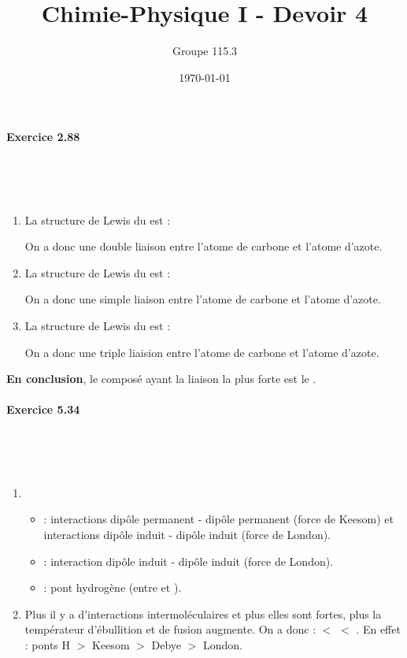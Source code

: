 \documentclass{article}
\title{Chimie-Physique I - Devoir 4}
\author{Groupe 115.3}
\date{\today}
\newcommand\exercice[1]{%
\paragraph{#1}%
~\par
~\par}
\newcommand\chemfigc[1]{
\vspace{0.5cm}
\begin{center}\chemfig{#1}\end{center}
\vspace{0.5cm}}
\begin{document}
\maketitle

\exercice{Exercice 2.88}

\begin{enumerate}\renewcommand{\theenumi}{\alph{enumi}}
	\item La structure de Lewis du  est :
	
	\chemfigc{H-\lewis{2, N}=C(-[:90]H)(-H)}
	
	On a donc une double liaison entre l'atome de carbone et
	l'atome d'azote.
	
	\item La structure de Lewis du  est :
	
	\chemfigc{H-\lewis{6, N}(-[:90]H)-C(-[:90]H)(-[:-90]H)-H}
	
	On a donc une simple liaison entre l'atome de carbone et 
	l'atome d'azote.
	
	\item La structure de Lewis du  est :
	
	\chemfigc{H-C~\lewis{0, N}}
	
	On a donc une triple liaision entre l'atome de carbone et
	l'atome d'azote.
\end{enumerate}

\textbf{En conclusion}, le composé ayant la liaison 
la plus forte est le .

\exercice{Exercice 5.34}

\begin{enumerate}\renewcommand{\theenumi}{\alph{enumi}}
	\item 
		\begin{itemize}
			\item
				 : interactions dipôle permanent -
				dipôle permanent (force de Keesom) et interactions
				dipôle induit - dipôle induit (force de London).
			\item
				 : interaction dipôle induit - dipôle 
				induit (force de London). 
			\item
				 : pont hydrogène (entre
				 et ).
			\end{itemize}
	\item Plus il y a d'interactions intermoléculaires et plus
				elles sont fortes, plus la températeur d'ébullition 
				et de fusion augmente. On a donc : 
				$<$  $<$ . En effet : 
				ponts H $>$ Keesom $>$ Debye $>$ London. 
\end{enumerate}	
\end{document}
